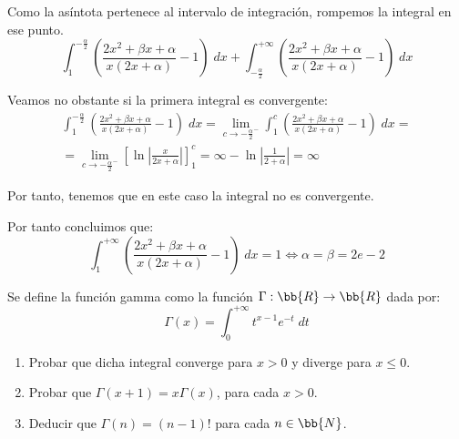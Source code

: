 \begin{ejercicio}
\begin{itemize}
\begin{itemize}
           Como la asíntota pertenece al intervalo de integración, rompemos la integral en ese punto.
           \begin{equation*}
               \int_1^{-\frac{\alpha}{2}} \left(\frac{2x^2+\beta x+\alpha}{x(2x+\alpha)}-1\right)\;dx
               + \int_{-\frac{\alpha}{2}}^{+\infty} \left(\frac{2x^2+\beta x+\alpha}{x(2x+\alpha)}-1\right)\;dx
           \end{equation*}

            Veamos no obstante si la primera integral es convergente:
           \begin{multline*}
               \int_1^{-\frac{\alpha}{2}} \left(\frac{2x^2+\beta x+\alpha}{x(2x+\alpha)}-1\right)\;dx =
               \lim_{c\to -\frac{\alpha}{2}^-} \int_1^{c} \left(\frac{2x^2+\beta x+\alpha}{x(2x+\alpha)}-1\right)\;dx
               =\\=
               \lim_{c\to -\frac{\alpha}{2}^-} \left[\ln \left|\frac{x}{2x+\alpha}\right|\right]_1^{c} 
               = \infty -\ln \left|\frac{1}{2+\alpha}\right| = \infty
           \end{multline*}

           Por tanto, tenemos que en este caso la integral no es convergente.
       \end{itemize}
    \end{itemize}

    Por tanto concluimos que:
    \begin{equation*}
        \int_1^{+\infty} \left(\frac{2x^2+\beta x+\alpha}{x(2x+\alpha)}-1\right)\;dx = 1 \Longleftrightarrow \alpha = \beta = 2e-2
    \end{equation*}
    
\end{ejercicio}

\begin{ejercicio}
    Se define la función gamma como la función $\Gamma:\bb{R}\to \bb{R}$ dada por:
    \begin{equation*}
        \Gamma(x) = \int_0^{+\infty} t^{x-1} e^{-t}\;dt
    \end{equation*}

    \begin{enumerate}
        \item Probar que dicha integral converge para $x>0$ y diverge para $x\leq 0$.
        \item Probar que $\Gamma(x+1)=x\Gamma(x)$, para cada $x>0$.
        \item Deducir que $\Gamma(n) = (n-1)!$ para cada $n\in \bb{N}$.
    \end{enumerate}
\end{ejercicio}



